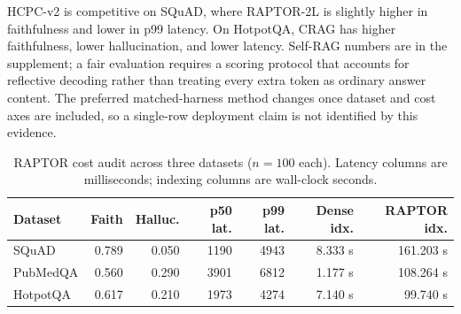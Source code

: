 HCPC-v2 is competitive on SQuAD, where RAPTOR-2L is slightly higher in
faithfulness and lower in p99 latency. On HotpotQA, CRAG has higher
faithfulness, lower hallucination, and lower latency. Self-RAG numbers are in
the supplement; a fair evaluation requires a scoring protocol that accounts
for reflective decoding rather than treating every extra token as ordinary
answer content. The preferred matched-harness method changes once dataset
and cost axes are included, so a single-row deployment claim is not
identified by this evidence.

\begin{table}[H]
\centering
\scriptsize
\caption{RAPTOR cost audit across three datasets (\(n=100\) each). Latency
columns are milliseconds; indexing columns are wall-clock seconds.}
\label{tab:raptorcost}
\begin{tabular}{lrrrrrr}
\toprule
Dataset & Faith & Halluc. & p50 lat. & p99 lat. & Dense idx. & RAPTOR idx. \\
\midrule
SQuAD & 0.789 & 0.050 & 1190 & 4943 & 8.333 s & 161.203 s \\
PubMedQA & 0.560 & 0.290 & 3901 & 6812 & 1.177 s & 108.264 s \\
HotpotQA & 0.617 & 0.210 & 1973 & 4274 & 7.140 s & 99.740 s \\
\bottomrule
\end{tabular}
\end{table}
